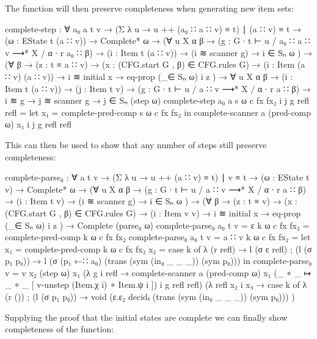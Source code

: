		The  function will then preserve completeness when
		generating new item sets:

		\begin{code}
			complete-step : ∀ {a₀ a t v} →
			  (Σ λ u → u ++ (a₀ ∷ a ∷ v) ≡ t) ∣ (a ∷ v) ≡ t →
			  (ω : EState t (a ∷ v)) →
			  Complete* ω →
			  (∀ {u X α β} →
			    (g : G ∙ t ⊢ u / a₀ ∷ a ∷ v ⟶* X / α ∙ r a₀ ∷ β) →
			    (i : Item t (a ∷ v)) → (i ≋ scanner g) →
			    i ∈ Sₙ ω
			  ) →
			  (∀ {β} →
			    (z : t ≡ a ∷ v) →
			    (x : (CFG.start G , β) ∈ CFG.rules G) →
			    (i : Item (a ∷ v) (a ∷ v)) →
			    i ≋ initial x → eq-prop (_∈ Sₙ ω) i z
			  ) →
			  ∀ {u X α β} →
			  (i : Item t (a ∷ v)) →
			  (j : Item t v) →
			  (g : G ∙ t ⊢ u / a ∷ v ⟶* X / α ∙ r a ∷ β) →
			  i ≋ g →
			  j ≋ scanner g →
			    j ∈ Sₙ (step ω)
			complete-step {a₀} {a} s ω c fx fx₂ i j g refl refl =
			  let
			    x₁ = complete-pred-comp s ω c fx fx₂
			  in complete-scanner a (pred-comp ω) x₁ i j g refl refl
		\end{code}

		This can then be used to show that any number of steps still preserve
		completeness:

		\begin{code}
			complete-parse₀ : ∀ {a t v} →
			  (Σ λ u → u ++ (a ∷ v) ≡ t) ∣ v ≡ t →
			  (ω : EState t v) →
			  Complete* ω →
			  (∀ {u X α β} →
			    (g : G ∙ t ⊢ u / a ∷ v ⟶* X / α ∙ r a ∷ β) →
			    (i : Item t v) → (i ≋ scanner g) →
			    i ∈ Sₙ ω
			  ) →
			  (∀ {β} →
			    (z : t ≡ v) →
			    (x : (CFG.start G , β) ∈ CFG.rules G) →
			    (i : Item v v) →
			    i ≋ initial x → eq-prop (_∈ Sₙ ω) i z
			  ) →
			  Complete (parse₀ ω)
			complete-parse₀ {a₀} {t} {v = ε} k ω c fx fx₂ = complete-pred-comp k ω c fx fx₂
			complete-parse₀ {a₀} {t} {v = a ∷ v} k ω c fx fx₂ =
			  let
			    x₁ = complete-pred-comp k ω c fx fx₂
			    x₂ = case k of
			      λ { (r refl) → l (σ ε refl)
			        ; (l (σ p₁ p₀)) → l (σ (p₁ ←∷ a₀) (trans (sym (in₀ _ _ _)) (sym p₀)))
			        }
			  in
			  complete-parse₀ {v = v} x₂ (step ω) x₁
			    (λ {g i refl → complete-scanner a (pred-comp ω) x₁
			      (_ ∘ _ ↦ _ ∘ _ [ v-unstep (Item.χ i) ∘ Item.ψ i ]) i g refl refl})
			    (λ {refl x₂ i x₃ → case k of
			      λ { (r ())
			        ; (l (σ p₁ p₀)) → void (ε.ε₂ decidₜ (trans (sym (in₀ _ _ _)) (sym p₀)))
			        }
			      })
		\end{code}

		Supplying the proof that the initial states are complete we can finally
		show completeness of the  function:

